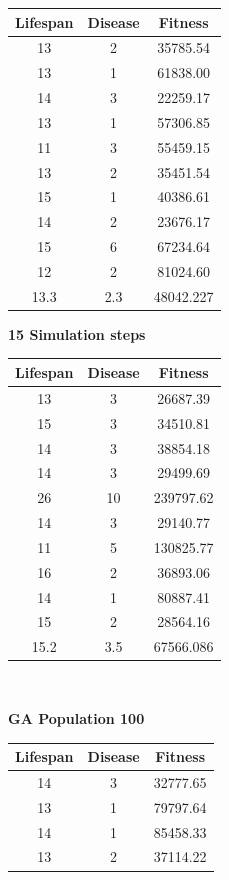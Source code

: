 \documentclass[conference,compsoc]{IEEEtran}
\begin{document}
\begin{table}[!t]
\begin{center}
\begin{minipage}{0.25\textwidth}
\begin{tabular}{|c|c|c|}
	\hline
	Lifespan & Disease & Fitness\\
	\hline
	13 & 2 & 35785.54\\
	13 & 1 & 61838.00\\
	14 & 3 & 22259.17\\
	13 & 1 & 57306.85\\
	11 & 3 & 55459.15\\
	13 & 2 & 35451.54\\
	15 & 1 & 40386.61\\
	14 & 2 & 23676.17\\
	15 & 6 & 67234.64\\
	12 & 2 & 81024.60\\
	\hline
	13.3 & 2.3 & 48042.227\\
	\hline
	\end{tabular}
\end{minipage}%
\begin{minipage}{0.25\textwidth}
\centering
\textbf{15 Simulation steps}\\
	\begin{tabular}{|c|c|c|}
	\hline
	Lifespan & Disease & Fitness\\
	\hline
	13 &  3 &  26687.39\\
	15 &  3 &  34510.81\\
	14 &  3 &  38854.18\\
	14 &  3 &  29499.69\\
	26 & 10 & 239797.62\\
	14 &  3 &  29140.77\\
	11 &  5 & 130825.77\\
	16 &  2 &  36893.06\\
	14 &  1 &  80887.41\\
	15 &  2 &  28564.16\\
	\hline
	15.2 & 3.5 & 67566.086\\
	\hline
	\end{tabular}
\end{minipage}%
\\[3ex]
\begin{minipage}{0.25\textwidth}
\centering
\textbf{GA Population 100}\\
	\begin{tabular}{|c|c|c|}
	\hline
	Lifespan & Disease & Fitness\\
	\hline
	14 & 3 & 32777.65\\
	13 & 1 & 79797.64\\
	14 & 1 & 85458.33\\
	13 & 2 & 37114.22\\

\end{tabular}
\end{minipage}
\end{center}
\end{table}
\end{document}
